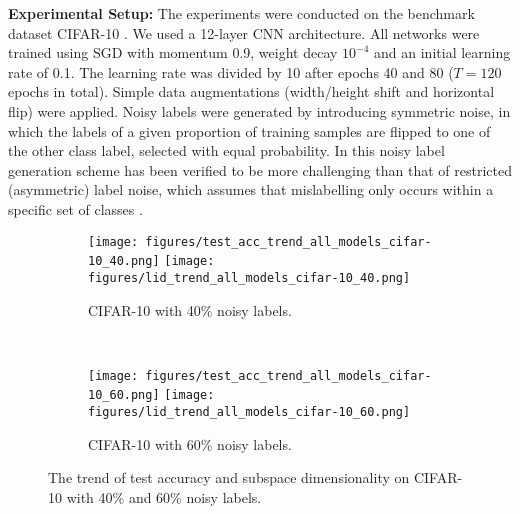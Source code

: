 \documentclass{article}
\begin{document}
\textbf{Experimental Setup:}
The experiments were conducted on the benchmark dataset CIFAR-10 \cite{krizhevsky2009learning}. We used a 12-layer CNN architecture.
All networks were trained using SGD with momentum 0.9, weight decay $10^{-4}$ and an initial learning rate of 0.1. The learning rate was divided by 10 after epochs 40 and 80 ($T=120$ epochs in total). 
Simple data augmentations (width/height shift and horizontal flip) were applied. Noisy labels were generated by introducing symmetric noise, in which the labels of a given proportion of training samples are flipped to one of the other class label, selected with equal probability. In \cite{vahdat2017toward} this noisy label generation scheme has been verified to be more challenging than that of restricted (asymmetric) label noise, which assumes that mislabelling only occurs within a specific set of classes \cite{reed2014training,patrini2017making}. 

\begin{figure}[!tb]
\centering
\begin{subfigure}{.5\textwidth}
  \centering
  \texttt{[image: figures/test\_acc\_trend\_all\_models\_cifar-10\_40.png]}
\texttt{[image: figures/lid\_trend\_all\_models\_cifar-10\_40.png]}
  \caption{CIFAR-10 with 40\% noisy labels.}
  \label{fig:dimensionality_1}
\end{subfigure} \\
\begin{subfigure}{.5\textwidth}
  \centering
  \texttt{[image: figures/test\_acc\_trend\_all\_models\_cifar-10\_60.png]}
\texttt{[image: figures/lid\_trend\_all\_models\_cifar-10\_60.png]}
  \caption{CIFAR-10 with 60\% noisy labels.}
  \label{fig:dimensionality_2}
\end{subfigure}
\caption{The trend of test accuracy and subspace dimensionality on CIFAR-10 with 40\% and 60\% noisy labels.}
\label{fig:dimensionality}
\vspace{-0.2in}
\end{figure}


\end{document}
